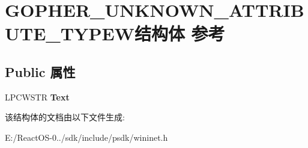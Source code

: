 \hypertarget{struct_g_o_p_h_e_r___u_n_k_n_o_w_n___a_t_t_r_i_b_u_t_e___t_y_p_e_w}{}\section{G\+O\+P\+H\+E\+R\+\_\+\+U\+N\+K\+N\+O\+W\+N\+\_\+\+A\+T\+T\+R\+I\+B\+U\+T\+E\+\_\+\+T\+Y\+P\+E\+W结构体 参考}
\label{struct_g_o_p_h_e_r___u_n_k_n_o_w_n___a_t_t_r_i_b_u_t_e___t_y_p_e_w}
\subsection*{Public 属性}
\begin{DoxyCompactItemize}
\item 
\mbox{\label{struct_g_o_p_h_e_r___u_n_k_n_o_w_n___a_t_t_r_i_b_u_t_e___t_y_p_e_w_a996f8ea2c1a45401a2ae2664466f1f8e}} 
L\+P\+C\+W\+S\+TR {\bfseries Text}
\end{DoxyCompactItemize}


该结构体的文档由以下文件生成\+:\begin{DoxyCompactItemize}
\item 
E\+:/\+React\+O\+S-\/0../sdk/include/psdk/wininet.\+h\end{DoxyCompactItemize}
